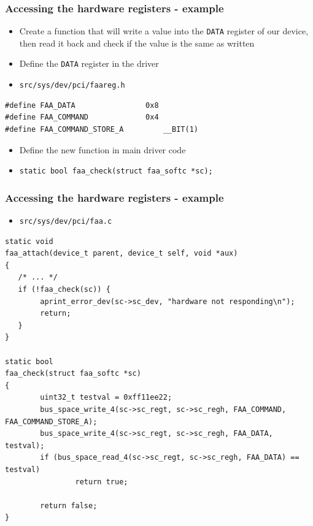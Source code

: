 \documentclass[dvipsnames,table]{beamer}
\begin{document}
\begin{frame}[fragile]
\frametitle{Accessing the hardware registers - example}
\begin{itemize}
	\item Create a function that will write a value into the {\tt DATA} register of our device, then read it back and check if the value is the same as written
	\item Define the {\tt DATA} register in the driver
	\item {\tt src/sys/dev/pci/faareg.h}
\end{itemize}
\begin{lstlisting}
#define FAA_DATA                0x8
#define FAA_COMMAND             0x4
#define FAA_COMMAND_STORE_A         __BIT(1)
\end{lstlisting}
\begin{itemize}
	\item Define the new function in main driver code
	\item {\tt static bool faa\_check(struct faa\_softc *sc);}
\end{itemize}
\end{frame}

\begin{frame}[fragile]
\frametitle{Accessing the hardware registers - example}
\begin{itemize}
	\item {\tt src/sys/dev/pci/faa.c}
\end{itemize}
\begin{lstlisting}
static void
faa_attach(device_t parent, device_t self, void *aux)
{
   /* ... */
   if (!faa_check(sc)) {
   		aprint_error_dev(sc->sc_dev, "hardware not responding\n");
        return;
   }
}

static bool
faa_check(struct faa_softc *sc)
{
        uint32_t testval = 0xff11ee22; 
        bus_space_write_4(sc->sc_regt, sc->sc_regh, FAA_COMMAND, FAA_COMMAND_STORE_A);
        bus_space_write_4(sc->sc_regt, sc->sc_regh, FAA_DATA, testval);
        if (bus_space_read_4(sc->sc_regt, sc->sc_regh, FAA_DATA) == testval)
                return true;

        return false;
}
\end{lstlisting}
\end{frame}
\end{document}
